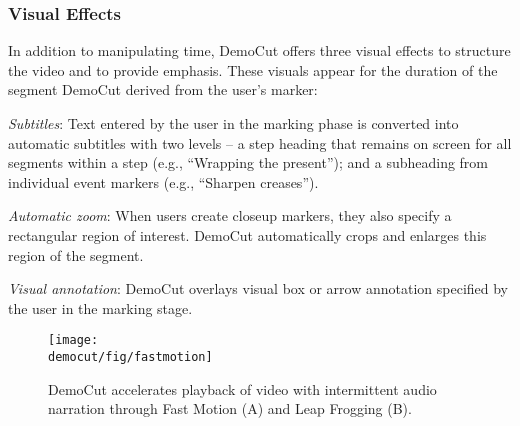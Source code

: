 \subsubsection{Visual Effects}
In addition to manipulating time, DemoCut offers three visual effects to structure the video and to provide emphasis. These visuals appear for the duration of the segment DemoCut derived from the user's marker:

{\em Subtitles}: Text entered by the user in the marking phase is converted into automatic subtitles with two levels -- a step heading that remains on screen for all segments within a step (e.g., ``Wrapping the present''); and a subheading from individual event markers (e.g., ``Sharpen creases'').

{\em Automatic zoom}: When users create closeup markers, they also specify a rectangular region of interest. DemoCut automatically crops and enlarges this region of the segment.

{\em Visual annotation}: DemoCut overlays visual box or arrow annotation specified by the user in the marking stage.


\begin{figure}[t]
  \centering
\texttt{[image: \\democut/fig/fastmotion]}
  \caption{DemoCut accelerates playback of video with intermittent audio narration through Fast Motion (A) and Leap Frogging (B).}
  \label{fig:fastmotion}
  \vspace{-0.1in}
\end{figure}

